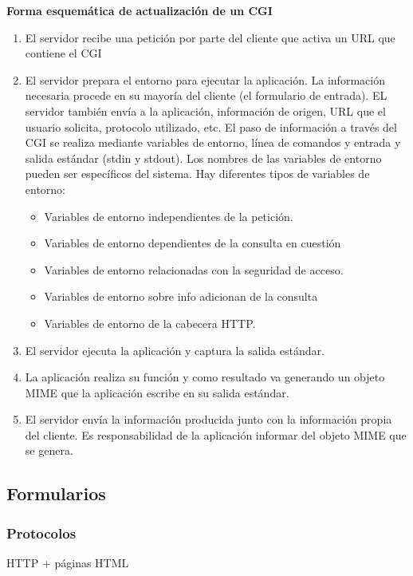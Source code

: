 \documentclass{apuntes}
\begin{document}
\textbf{Forma esquemática de actualización de un CGI}
\begin{enumerate}
\item El servidor recibe una petición por parte del cliente que activa un URL que contiene el CGI
\item El servidor prepara el entorno para ejecutar la aplicación. La información necesaria procede en su mayoría del cliente (el formulario de entrada). EL servidor también envía a la aplicación, información de origen, URL que el usuario solicita, protocolo utilizado, etc. El paso de información a través del CGI se realiza mediante variables de entorno, línea de comandos y entrada y salida estándar (stdin y stdout). Los nombres de las variables de entorno pueden ser específicos del sistema. Hay diferentes tipos de variables de entorno:
\begin{itemize}
\item Variables de entorno independientes de la petición.
\item Variables de entorno dependientes de la consulta en cuestión
\item Variables de entorno relacionadas con la seguridad de acceso.
\item Variables de entorno sobre info adicionan de la consulta
\item Variables de entorno de la cabecera HTTP.
\end{itemize}
\item El  servidor ejecuta la aplicación y captura la salida estándar.
\item La aplicación realiza su función y como resultado va generando un objeto MIME que la aplicación escribe en su salida estándar.
\item El servidor envía la información producida junto con la información propia del cliente. Es responsabilidad de la aplicación informar del objeto MIME que se genera.
\end{enumerate}

\subsection{Formularios}
\subsubsection{Protocolos}
HTTP + páginas HTML
\end{document}
